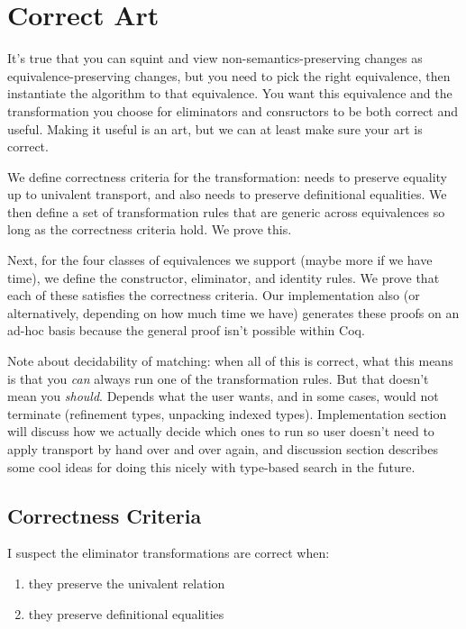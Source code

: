 \section{Correct Art}

It's true that you can squint and view non-semantics-preserving changes as equivalence-preserving changes,
but you need to pick the right equivalence, then instantiate the algorithm to that equivalence.
You want this equivalence and the transformation you choose for eliminators and consructors to be both correct and useful.
Making it useful is an art, but we can at least make sure your art is correct.

We define correctness criteria for the transformation: needs to preserve equality up to univalent transport, and also needs to
preserve definitional equalities.
We then define a set of transformation rules that are generic across equivalences so long as the correctness criteria hold.
We prove this.

Next, for the four classes of equivalences we support (maybe more if we have time), we define the constructor, eliminator, and identity rules.
We prove that each of these satisfies the correctness criteria.
Our implementation also (or alternatively, depending on how much time we have) generates these proofs on an ad-hoc basis because
the general proof isn't possible within Coq.

Note about decidability of matching: when all of this is correct, what this means is that you \textit{can} always
run one of the transformation rules. But that doesn't mean you \textit{should}. Depends what the user wants,
and in some cases, would not terminate (refinement types, unpacking indexed types). Implementation section will
discuss how we actually decide which ones to run so user doesn't need to apply transport by hand over and over again,
and discussion section describes some cool ideas for doing this nicely with type-based search in the future.

\subsection{Correctness Criteria}

I suspect the eliminator transformations are correct when:

\begin{enumerate}
\item they preserve the univalent relation
\item they preserve definitional equalities
\end{enumerate}

